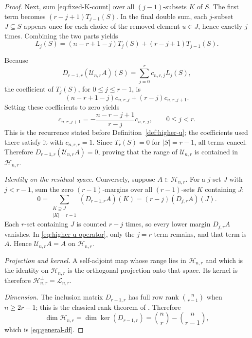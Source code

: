 \documentclass[11pt]{article}
\theoremstyle{plain}
\theoremstyle{definition}
\theoremstyle{remark}
\newcommand{\cU}{\mathcal U}
\newcommand{\cH}{\mathcal H}
\newcommand{\cL}{\mathcal L}
\begin{document}
\begin{proof}
Next, sum \eqref{eq:fixed-K-count} over all $(j-1)$-subsets $K$ of $S$.
The first term becomes $(r-j+1)T_{j-1}(S)$.  In the final double sum, each
$j$-subset $J\subseteq S$ appears once for each choice of the removed element
$u\in J$, hence exactly $j$ times.  Combining the two parts yields
  \begin{equation*}
 L_j(S)
 =(n-r+1-j)T_j(S)+(r-j+1)T_{j-1}(S).
\end{equation*}

Because
\[
 D_{r-1,r}(\cU_{n,r}A)(S)=\sum_{j=0}^r c_{n,r,j}L_j(S),
\]
the coefficient of $T_j(S)$, for $0\le j\le r-1$, is
\[
 (n-r+1-j)c_{n,r,j}+(r-j)c_{n,r,j+1}.
\]
Setting these coefficients to zero yields
\[
 c_{n,r,j+1}
 =-\frac{n-r-j+1}{r-j}c_{n,r,j},
 \qquad 0\le j<r.
\]
This is the recurrence stated before Definition~\ref{def:higher-u}; the
coefficients used there satisfy it with $c_{n,r,r}=1$.  Since $T_r(S)=0$
for $|S|=r-1$, all terms cancel.  Therefore
$D_{r-1,r}(\cU_{n,r}A)=0$, proving that the range of $\cU_{n,r}$ is
contained in $\cH_{n,r}$.

\medskip
\noindent\emph{Identity on the residual space.}
Conversely, suppose $A\in\cH_{n,r}$.  For a $j$-set $J$ with $j<r-1$,
sum the zero $(r-1)$-margins over all $(r-1)$-sets $K$ containing $J$:
\[
 0=\sum_{\substack{K\supseteq J\\|K|=r-1}}
   (D_{r-1,r}A)(K)
  =(r-j)(D_{j,r}A)(J).
\]
Each $r$-set containing $J$ is counted $r-j$ times, so every lower margin
$D_{j,r}A$ vanishes.  In \eqref{eq:higher-u-operator}, only the $j=r$ term
remains, and that term is $A$.  Hence $\cU_{n,r}A=A$ on $\cH_{n,r}$.

\medskip
\noindent\emph{Projection and kernel.}
A self-adjoint map whose range lies in $\cH_{n,r}$ and which is the identity on
$\cH_{n,r}$ is the orthogonal projection onto that space.  Its kernel is
therefore $\cH_{n,r}^{\perp}=\cL_{n,r}$.

\medskip
\noindent\emph{Dimension.}
The inclusion matrix $D_{r-1,r}$ has full row rank
$\binom n{r-1}$ when $n\ge2r-1$; this is the classical rank theorem of
\citet{Gottlieb1966}.  Therefore
\[
 \dim\cH_{n,r}
 =\dim\ker(D_{r-1,r})
 =\binom nr-\binom n{r-1},
\]
which is \eqref{eq:general-df}.
\end{proof}
\end{document}
